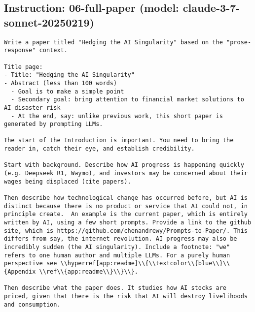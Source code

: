 \subsection*{Instruction: 06-full-paper  (model: claude-3-7-sonnet-20250219)}
\vspace{-1ex}
\begin{lstlisting}[language=text,breaklines=true,frame=single]
Write a paper titled "Hedging the AI Singularity" based on the "prose-response" context.

Title page:
- Title: "Hedging the AI Singularity"  
- Abstract (less than 100 words)
  - Goal is to make a simple point
  - Secondary goal: bring attention to financial market solutions to AI disaster risk
  - At the end, say: unlike previous work, this short paper is generated by prompting LLMs.

The start of the Introduction is important. You need to bring the reader in, catch their eye, and establish credibility.

Start with background. Describe how AI progress is happening quickly (e.g. Deepseek R1, Waymo), and investors may be concerned about their wages being displaced (cite papers). 

Then describe how technological change has occurred before, but AI is distinct because there is no product or service that AI could not, in principle create.  An example is the current paper, which is entirely written by AI, using a few short prompts. Provide a link to the github site, which is https://github.com/chenandrewy/Prompts-to-Paper/. This differs from say, the internet revolution. AI progress may also be incredibly sudden (the AI singularity). Include a footnote: "we" refers to one human author and multiple LLMs. For a purely human perspective see \\hyperref[app:readme]\\{\\textcolor\\{blue\\}\\{Appendix \\ref\\{app:readme\\}\\}\\}.

Then describe what the paper does. It studies how AI stocks are priced, given that there is the risk that AI will destroy livelihoods and consumption.       


\end{lstlisting}
